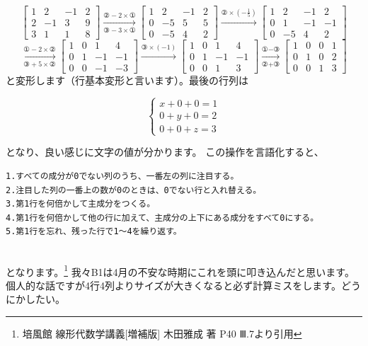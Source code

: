 \documentclass[lualatex,paper=a4paper]{jlreq}
\begin{document}
$$\begin{bmatrix}
        1 & 2  & -1 & 2 \\
        2 & -1 & 3  & 9 \\
        3 & 1  & 1  & 8
    \end{bmatrix}
    \xrightarrow[\text{③}-3\times\text{①}]{\text{②}-2\times\text{①}}
    \begin{bmatrix}
        1 & 2  & -1 & 2 \\
        0 & -5 & 5  & 5 \\
        0 & -5 & 4  & 2
    \end{bmatrix}
    \xrightarrow{\text{②}\times(-\frac{1}{5})}
    \begin{bmatrix}
        1 & 2  & -1 & 2  \\
        0 & 1  & -1 & -1 \\
        0 & -5 & 4  & 2
    \end{bmatrix}$$
$$\xrightarrow[\text{③}+5\times\text{②}]{\text{①}-2\times\text{②}}
    \begin{bmatrix}
        1 & 0 & 1  & 4  \\
        0 & 1 & -1 & -1 \\
        0 & 0 & -1 & -3
    \end{bmatrix}
    \xrightarrow{\text{③}\times(-1)}
    \begin{bmatrix}
        1 & 0 & 1  & 4  \\
        0 & 1 & -1 & -1 \\
        0 & 0 & 1  & 3
    \end{bmatrix}
    \xrightarrow[\text{②}+\text{③}]{\text{①}-\text{③}}
    \begin{bmatrix}
        1 & 0 & 0 & 1 \\
        0 & 1 & 0 & 2 \\
        0 & 0 & 1 & 3
    \end{bmatrix}$$
と変形します（行基本変形と言います）。最後の行列は

$$\begin{cases}
        x + 0 + 0 = 1 \\
        0 + y + 0 = 2 \\
        0 + 0 + z = 3
    \end{cases}$$

となり、良い感じに文字の値が分かります。
この操作を言語化すると、\\
\hrulefill
\begin{verbatim}
1.すべての成分が0でない列のうち、一番左の列に注目する。
2.注目した列の一番上の数が0のときは、0でない行と入れ替える。
3.第1行を何倍かして主成分をつくる。
4.第1行を何倍かして他の行に加えて、主成分の上下にある成分をすべて0にする。
5.第1行を忘れ、残った行で1～4を繰り返す。
\end{verbatim}
\hrulefill\\
となります。\footnote{培風館 線形代数学講義[増補版] 木田雅成 著 P40 Ⅲ.7より引用}
我々B1は4月の不安な時期にこれを頭に叩き込んだと思います。\\
個人的な話ですが4行4列よりサイズが大きくなると必ず計算ミスをします。どうにかしたい。
\end{document}
